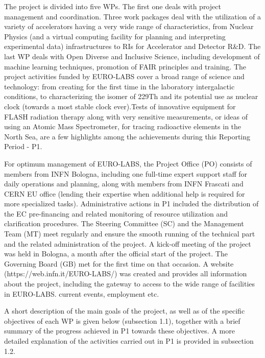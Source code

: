 {The project is divided into five \acrfull{WP}s. The first one deals with project management and coordination. Three work packages deal with the utilization of a variety of accelerators having a very wide range of characteristics, from Nuclear Physics (and a virtual computing facility for planning and interpreting experimental data) infrastructures to RIs for Accelerator and Detector R\&D. The last WP deals with Open Diverse and Inclusive Science, including development of machine learning techniques, promotion of FAIR principles and training.  The project activities funded by EURO-LABS cover a broad range of science and technology: from creating for the first time in the laboratory intergalactic conditions, to characterizing the isomer of 229Th and its potential use as nuclear clock (towards a most stable clock ever).Tests of innovative equipment for FLASH radiation therapy along with very sensitive measurements,  or ideas of using an Atomic Mass Spectrometer, for tracing radioactive elements in the North Sea, are a few highlights among the achievements during this Reporting Period - P1.

For optimum management of EURO-LABS, the Project Office (PO) consists of members from INFN Bologna, including one full-time expert support staff for daily operations and planning, along with members from INFN Frascati and CERN EU office (lending their expertise when additional help is required for more specialized tasks). Administrative actions in P1 included the distribution of the EC pre-financing and related monitoring of resource utilization and clarification procedures. The Steering Committee (SC) and the Management Team (MT) meet regularly and ensure the smooth running of the technical part and the related administration of the project. A kick-off meeting of the project was held in Bologna, a month after the official start of the project. The Governing Board (GB) met for the first time on that occasion. A website (https://web.infn.it/EURO-LABS/) was created and provides all information about the project, including the gateway to access to the wide range of facilities in EURO-LABS. current events, employment etc.

A short description of the main goals of the project, as well as of the specific objectives of each WP is given below (subsection 1.1), together with a brief summary of the progress achieved in P1 towards these objectives. A more detailed explanation of the activities carried out in P1 is provided in subsection 1.2. 

}

